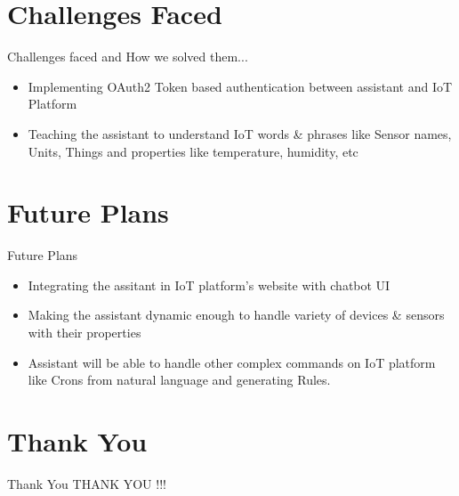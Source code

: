 \documentclass[10pt, a4paper]{beamer}
\begin{document}
\section{Challenges Faced}
\begin{frame}{Challenges faced and How we solved them...}
	\begin{itemize}
		\item Implementing OAuth2 Token based authentication between assistant and IoT Platform
		\newline\\
		\item Teaching the assistant to understand IoT words \& phrases like Sensor names, Units, Things and properties like temperature, humidity, etc
	\end{itemize}
\end{frame}

\section{Future Plans}
\begin{frame}{Future Plans}
	\begin{itemize}
		\item Integrating the assitant in IoT platform's website with chatbot UI
		\newline\\
		\item Making the assistant dynamic enough to handle variety of devices \& sensors with their properties
		\newline\\
		\item Assistant will be able to handle other complex commands on IoT platform like Crons from natural language and generating Rules.
	\end{itemize}
\end{frame}


\section{Thank You}
\begin{frame}{Thank You}
	\centering THANK YOU !!!
\end{frame}
\end{document}

